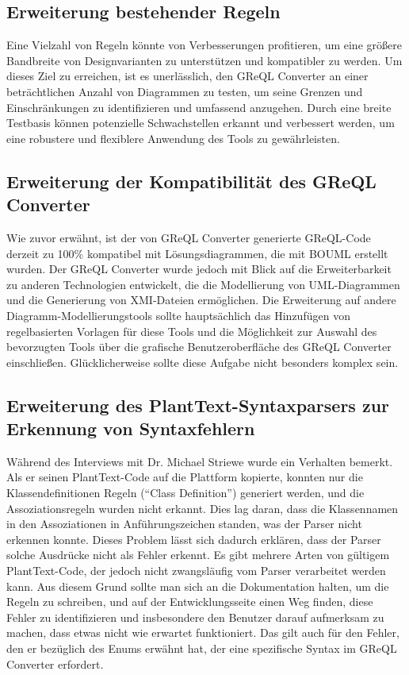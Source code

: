 \subsection{Erweiterung bestehender Regeln}

Eine Vielzahl von Regeln könnte von Verbesserungen profitieren, um eine größere Bandbreite von Designvarianten zu
unterstützen und kompatibler zu werden. Um dieses Ziel zu erreichen, ist es unerlässlich, den GReQL Converter an einer
beträchtlichen Anzahl von Diagrammen zu testen, um seine Grenzen und Einschränkungen zu identifizieren und umfassend
anzugehen. Durch eine breite Testbasis können potenzielle Schwachstellen erkannt und verbessert werden, um eine
robustere und flexiblere Anwendung des Tools zu gewährleisten.


\subsection{Erweiterung der Kompatibilität des GReQL Converter}

Wie zuvor erwähnt, ist der von GReQL Converter generierte GReQL-Code derzeit zu 100\% kompatibel mit Lösungsdiagrammen,
die mit BOUML erstellt wurden. Der GReQL Converter wurde jedoch mit Blick auf die Erweiterbarkeit zu anderen
Technologien entwickelt, die die Modellierung von UML-Diagrammen und die Generierung von XMI-Dateien ermöglichen. Die
Erweiterung auf andere Diagramm-Modellierungstools sollte hauptsächlich das Hinzufügen von regelbasierten Vorlagen für
diese Tools und die Möglichkeit zur Auswahl des bevorzugten Tools über die grafische Benutzeroberfläche des GReQL
Converter einschließen. Glücklicherweise sollte diese Aufgabe nicht besonders komplex sein.

\subsection{Erweiterung des PlantText-Syntaxparsers zur Erkennung von Syntaxfehlern}
Während des Interviews mit Dr. Michael Striewe wurde ein Verhalten bemerkt. Als er seinen PlantText-Code auf die
Plattform kopierte, konnten nur die Klassendefinitionen Regeln (``Class Definition'') generiert werden, und die
Assoziationsregeln wurden nicht erkannt. Dies lag daran, dass die Klassennamen in den Assoziationen in
Anführungszeichen standen, was der Parser nicht erkennen konnte. Dieses Problem lässt sich dadurch erklären, dass der
Parser solche Ausdrücke nicht als Fehler erkennt. Es gibt mehrere Arten von gültigem PlantText-Code, der jedoch nicht
zwangsläufig vom Parser verarbeitet werden kann. Aus diesem Grund sollte man sich an die Dokumentation halten, um die
Regeln zu schreiben, und auf der Entwicklungsseite einen Weg finden, diese Fehler zu identifizieren und insbesondere den
Benutzer darauf aufmerksam zu machen, dass etwas nicht wie erwartet funktioniert. Das gilt auch für den Fehler, den er
bezüglich des Enums erwähnt hat, der eine spezifische Syntax im GReQL Converter erfordert.

